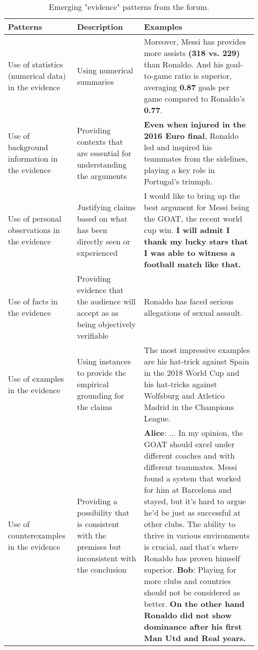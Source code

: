 \begin{table*}[h!]
  \caption{Emerging "evidence" patterns from the forum.}
  \begin{tabular}{>{\raggedright\arraybackslash}p{2.5cm}>{\raggedright\arraybackslash}p{4cm}>{\raggedright\arraybackslash}p{9.5cm}}
    \toprule
    \textbf{Patterns} & \textbf{Description} & \textbf{Examples}\\
    \midrule
    Use of statistics (numerical data) in the evidence & Using numerical summaries ~\cite{rieke_argumentation_2012} & Moreover, Messi has provides more assists \textbf{(318 vs. 229)} than Ronaldo. And his goal-to-game ratio is superior, averaging \textbf{0.87} goals per game compared to Ronaldo's \textbf{0.77}. \\
    \hline
    Use of background information in the evidence & Providing contexts that are essential for understanding the arguments ~\cite{lunsford_everythings_2018} & \textbf{Even when injured in the 2016 Euro final}, Ronaldo led and inspired his teammates from the sidelines, playing a key role in Portugal's triumph. \\
    \hline
    Use of personal observations in the evidence & Justifying claims based on what has been directly seen or experienced ~\cite{kuhn_students_2005} & I would like to bring up the best argument for Messi being the GOAT, the recent world cup win. \textbf{I will admit I thank my lucky stars that I was able to witness a football match like that.} \\
    \hline
    Use of facts in the evidence & Providing evidence that the audience will accept as as being objectively verifiable ~\cite{rottenberg_structure_2014} & Ronaldo has faced serious allegations of sexual assault. \\
    \hline
    Use of examples in the evidence & Using instances to provide the empirical grounding for the claims~\cite{rieke_argumentation_2012} & The most impressive examples are his hat-trick against Spain in the 2018 World Cup and his hat-tricks against Wolfsburg and Atletico Madrid in the Champions League. \\
    \hline
    Use of counterexamples in the evidence & Providing a possibility that is consistent with the premises but inconsistent with the conclusion ~\cite{johnson-laird_how_2008} & \textbf{Alice}: ... In my opinion, the GOAT should excel under different coaches and with different teammates. Messi found a system that worked for him at Barcelona and stayed, but it's hard to argue he'd be just as successful at other clubs. The ability to thrive in various environments is crucial, and that's where Ronaldo has proven himself superior. \textbf{Bob}: Playing for more clubs and countries should not be considered as better. \textbf{On the other hand Ronaldo did not show dominance after his first Man Utd and Real years.} \\
    \bottomrule
  \end{tabular}
\end{table*}

